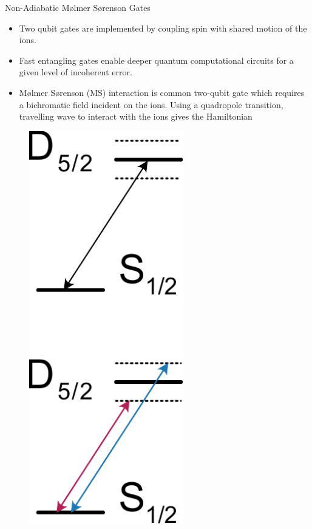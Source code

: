\documentclass[final]{beamer}
\begin{document}
\begin{frame}{}
\begin{center}
\begin{columns}[t]
\begin{column}{0.49\textwidth}
    \begin{alertblock}{Non-Adiabatic Mølmer Sørenson Gates}
      \begin{minipage}{0.83\linewidth}
      \begin{itemize}
      \item Two qubit gates are implemented by coupling spin with shared motion of the ions.
      \item Fast entangling gates enable deeper quantum computational circuits for a given level of incoherent error.
      \item Mølmer Sørenson (MS) interaction is common two-qubit gate which requires a
      bichromatic field incident on the ions. Using a quadropole transition, travelling
      wave to interact with the ions gives the Hamiltonian
      \end{itemize}
      \end{minipage}
      \begin{minipage}{0.14\linewidth}
      \begin{figure}
        \includegraphics[width=0.6\textwidth]{./figs/level_structure.pdf}

\end{figure}
\end{minipage}
\end{alertblock}
\end{column}
\end{columns}
\end{center}
\end{frame}
\end{document}
